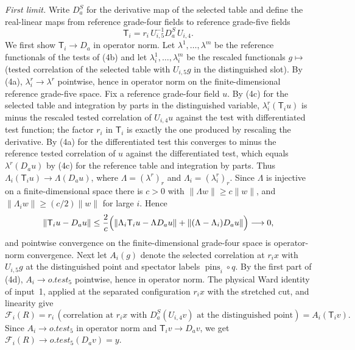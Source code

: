 \emph{First limit.} Write $D_a^S$ for the derivative map of the selected
table and define the real-linear maps from reference grade-four fields to
reference grade-five fields
\[
 \mathsf T_i=r_i\,U_{i,5}^{-1}D_a^S\,U_{i,4}.
\]
We first show $\mathsf T_i\to D_a$ in operator norm. Let
$\lambda^1,\ldots,\lambda^m$ be the reference functionals of the tests
of (4b) and let $\lambda^1_i,\ldots,\lambda^m_i$ be the rescaled
functionals $g\mapsto$ (tested correlation of the selected table with
$U_{i,5}g$ in the distinguished slot). By (4a), $\lambda^r_i\to\lambda^r$
pointwise, hence in operator norm on the finite-dimensional reference
grade-five space. Fix a reference grade-four field $u$. By (4c) for the
selected table and integration by parts in the distinguished variable,
$\lambda^r_i(\mathsf T_iu)$ is minus the rescaled tested correlation of
$U_{i,4}u$ against the test with differentiated test function; the factor
$r_i$ in $\mathsf T_i$ is exactly the one produced by rescaling the
derivative. By (4a) for the differentiated test this converges to minus
the reference tested correlation of $u$ against the differentiated test,
which equals $\lambda^r(D_au)$ by (4c) for the reference table and
integration by parts. Thus $\Lambda_i(\mathsf T_iu)\to\Lambda(D_au)$,
where $\Lambda=(\lambda^r)_r$ and $\Lambda_i=(\lambda^r_i)_r$. Since
$\Lambda$ is injective on a finite-dimensional space there is $c>0$ with
$\|\Lambda w\|\ge c\|w\|$, and $\|\Lambda_iw\|\ge(c/2)\|w\|$ for large
$i$. Hence
\[
 \|\mathsf T_iu-D_au\|\le\frac2c\Bigl(
 \|\Lambda_i\mathsf T_iu-\Lambda D_au\|
 +\|(\Lambda-\Lambda_i)D_au\|\Bigr)\longrightarrow0,
\]
and pointwise convergence on the finite-dimensional grade-four space is
operator-norm convergence. Next let $A_i(g)$ denote the selected
correlation at $r_ix$ with $U_{i,5}g$ at the distinguished point and
spectator labels $\operatorname{pins}_i\circ q$. By the first part of
(4d), $A_i\to o.test_5$ pointwise, hence in operator norm. The physical
Ward identity of input~1, applied at the separated configuration $r_ix$
with the stretched cut, and linearity give
\[
 \mathscr F_i(R)=r_i\,(\text{correlation at }r_ix\text{ with }
 D_a^S(U_{i,4}v)\text{ at the distinguished point})
 =A_i(\mathsf T_iv).
\]
Since $A_i\to o.test_5$ in operator norm and
$\mathsf T_iv\to D_av$, we get
$\mathscr F_i(R)\to o.test_5(D_av)=y$.

